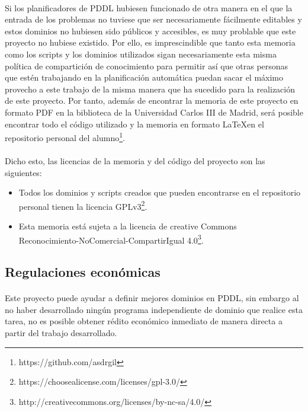 \documentclass{article}
\begin{document}
\paragraph{}
Si los planificadores de PDDL hubiesen funcionado de otra manera en el que la entrada de los problemas no tuviese que ser necesariamente fácilmente editables y estos dominios no hubiesen sido públicos y accesibles, es muy problable que este proyecto no hubiese existido. Por ello, es imprescindible que tanto esta memoria como los scripts y los dominios utilizados sigan necesariamente esta misma política de compartición de conocimiento para permitir así que otras personas que estén trabajando en la planificación automática puedan sacar el máximo provecho a este trabajo de la misma manera que ha sucedido para la realización de este proyecto. Por tanto, además de encontrar la memoria de este proyecto en formato PDF en la biblioteca de la Universidad Carlos III de Madrid, será posible encontrar todo el código utilizado y la memoria en formato \LaTeX en el repositorio personal del alumno\footnote{https://github.com/asdrgil}.

\paragraph{}
Dicho esto, las licencias de la memoria y del código del proyecto son las siguientes:
\begin{itemize}
    \item Todos los dominios y scripts creados que pueden encontrarse en el repositorio personal tienen la licencia GPLv3\footnote{https://choosealicense.com/licenses/gpl-3.0/}.
    \item Esta memoria está sujeta a la licencia de creative Commons \\ Reconocimiento-NoComercial-CompartirIgual 4.0\footnote{http://creativecommons.org/licenses/by-nc-sa/4.0/}.
\end{itemize}

\subsection{Regulaciones económicas}
\paragraph{}
Este proyecto puede ayudar a definir mejores dominios en PDDL, sin embargo al no haber desarrollado ningún programa independiente de dominio que realice esta tarea, no es posible obtener rédito económico inmediato de manera directa a partir del trabajo desarrollado.
\end{document}

